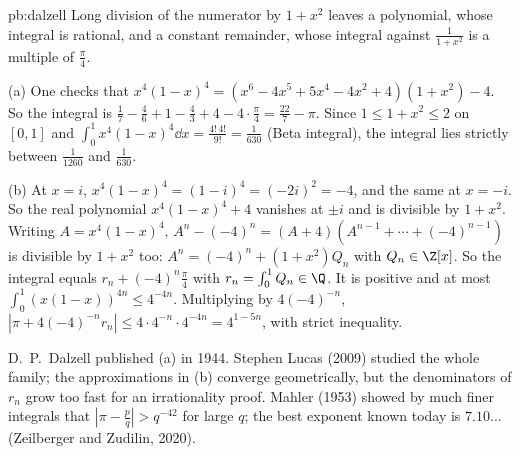 \begin{solution}{pb:dalzell}
\idea Long division of the numerator by $1+x^2$ leaves a polynomial, whose integral is rational, and a constant remainder, whose
integral against $\frac1{1+x^2}$ is a multiple of $\frac\pi4$.

\writeup (a) One checks that $x^4(1-x)^4=(x^6-4x^5+5x^4-4x^2+4)(1+x^2)-4$. So the integral is
$\frac17-\frac46+1-\frac43+4-4\cdot\frac\pi4=\frac{22}7-\pi$. Since $1\le1+x^2\le2$ on $[0,1]$ and $\int_0^1x^4(1-x)^4\dd x=\frac{4!\,4!}{9!}=\frac1{630}$ (Beta
integral), the integral lies strictly between $\frac1{1260}$ and $\frac1{630}$.

(b) At $x=i$, $x^4(1-x)^4=(1-i)^4=(-2i)^2=-4$, and the same at $x=-i$. So the real polynomial $x^4(1-x)^4+4$ vanishes at $\pm i$ and is
divisible by $1+x^2$. Writing $A=x^4(1-x)^4$, $A^n-(-4)^n=(A+4)(A^{n-1}+\cdots+(-4)^{n-1})$ is divisible by $1+x^2$ too: $A^n=(-4)^n+(1+x^2)Q_n$ with
$Q_n\in\Z[x]$. So the integral equals $r_n+(-4)^n\frac\pi4$ with $r_n=\int_0^1Q_n\in\Q$. It is positive and at most $\int_0^1(x(1-x))^{4n}\le4^{-4n}$.
Multiplying by $4(-4)^{-n}$, $|\pi+4(-4)^{-n}r_n|\le4\cdot4^{-n}\cdot4^{-4n}=4^{1-5n}$, with strict inequality.

\leads D.~P.~Dalzell published (a) in 1944. Stephen Lucas (2009) studied the whole family; the approximations in (b) converge
geometrically, but the denominators of $r_n$ grow too fast for an irrationality proof. Mahler (1953) showed by much finer integrals
that $|\pi-\frac pq|>q^{-42}$ for large $q$; the best exponent known today is $7.10\ldots$ (Zeilberger and Zudilin, 2020).
\end{solution}

